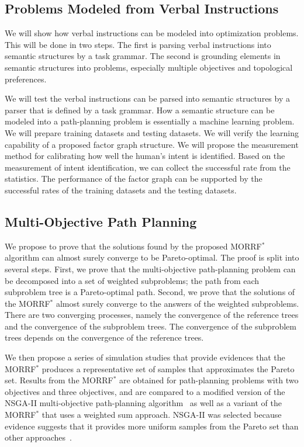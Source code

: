 \documentclass[phd]{byuprop}
\begin{document}
\subsection{Problems Modeled from Verbal Instructions}
\label{sec:validation:understanding_verbal_command}

We will show how verbal instructions can be modeled into optimization problems.
This will be done in two steps.
The first is parsing verbal instructions into semantic structures by a task grammar.
The second is grounding elements in semantic structures into problems, especially multiple objectives and topological preferences.

We will test the verbal instructions can be parsed into semantic structures by a parser that is defined by a task grammar.
How a semantic structure can be modeled into a path-planning problem is essentially a machine learning problem.
We will prepare training datasets and testing datasets.
We will verify the learning capability of a proposed factor graph structure.
We will propose the measurement method for calibrating how well the human's intent is identified.
Based on the measurement of intent identification, we can collect the successful rate from the statistics.
The performance of the factor graph can be supported by the successful rates of the training datasets and the testing datasets.

\subsection{Multi-Objective Path Planning}
\label{sec:validation:multi_objective_path_planning}

We propose to prove that the solutions found by the proposed MORRF$^{*}$ algorithm can almost surely converge to be Pareto-optimal.
The proof is split into several steps.
First, we prove that the multi-objective path-planning problem can be decomposed into a set of weighted subproblems;
the path from each subproblem tree is a Pareto-optimal path.
Second, we prove that the solutions of the MORRF$^{*}$ almost surely converge to the answers of the weighted subproblems.
There are two converging processes, namely the convergence of the reference trees and the convergence of the subproblem trees.
The convergence of the subproblem trees depends on the convergence of the reference trees.

We then propose a series of simulation studies that provide evidences that the MORRF$^{*}$ produces a representative set of samples that approximates the Pareto set.
Results from the MORRF$^{*}$ are obtained for path-planning problems with two objectives and three objectives, and are compared to a modified version of the NSGA-II multi-objective path-planning algorithm~\cite{Ahmed2013} as well as a variant of the MORRF$^{*}$ that uses a weighted sum approach.
NSGA-II was selected because evidence suggests that it provides more uniform samples from the Pareto set than other approaches~\cite{Deb2002}.
\end{document}
